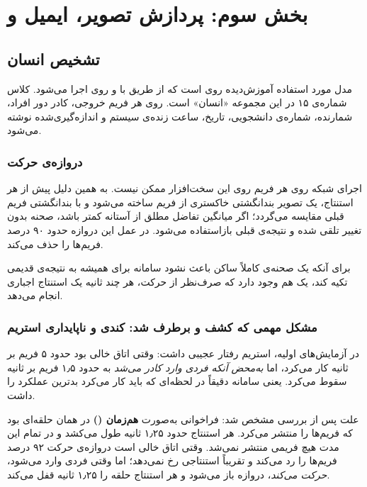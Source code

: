 \section{بخش سوم: پردازش تصویر، ایمیل و }

\subsection{تشخیص انسان}

مدل مورد استفاده  آموزش‌دیده روی  است که از طریق  با  و  روی  اجرا می‌شود. کلاس شماره‌ی ۱۵ در این مجموعه «انسان» است. روی هر فریم خروجی، کادر دور افراد، شمارنده، شماره‌ی دانشجویی، تاریخ، ساعت زنده‌ی سیستم و  اندازه‌گیری‌شده نوشته می‌شود.

\subsubsection*{دروازه‌ی حرکت}

اجرای شبکه روی هر فریم روی این سخت‌افزار ممکن نیست. به همین دلیل پیش از هر استنتاج، یک تصویر بندانگشتی  خاکستری از فریم ساخته می‌شود و با بندانگشتی فریم قبلی مقایسه می‌گردد؛ اگر میانگین تفاضل مطلق از آستانه کمتر باشد، صحنه بدون تغییر تلقی شده و نتیجه‌ی قبلی بازاستفاده می‌شود. در عمل این دروازه حدود ۹۰ درصد فریم‌ها را حذف می‌کند.

برای آنکه یک صحنه‌ی کاملاً ساکن باعث نشود سامانه برای همیشه به نتیجه‌ی قدیمی تکیه کند، یک  هم وجود دارد که صرف‌نظر از حرکت، هر چند ثانیه یک استنتاج اجباری انجام می‌دهد.

\subsubsection*{مشکل مهمی که کشف و برطرف شد: کندی و ناپایداری استریم}

در آزمایش‌های اولیه، استریم رفتار عجیبی داشت: وقتی اتاق خالی بود حدود ۵ فریم بر ثانیه کار می‌کرد، اما \emph{به‌محض آنکه فردی وارد کادر می‌شد} به حدود ۱٫۵ فریم بر ثانیه سقوط می‌کرد. یعنی سامانه دقیقاً در لحظه‌ای که باید کار می‌کرد بدترین عملکرد را داشت.

علت پس از بررسی مشخص شد: فراخوانی  به‌صورت \textbf{هم‌زمان ()} در همان حلقه‌ای بود که فریم‌ها را منتشر می‌کرد. هر استنتاج حدود ۱٫۲۵ ثانیه طول می‌کشد و در تمام این مدت هیچ فریمی منتشر نمی‌شد. وقتی اتاق خالی است دروازه‌ی حرکت ۹۲ درصد فریم‌ها را رد می‌کند و تقریباً استنتاجی رخ نمی‌دهد؛ اما وقتی فردی وارد می‌شود، \emph{حرکت می‌کند}، دروازه باز می‌شود و هر استنتاج حلقه را ۱٫۲۵ ثانیه قفل می‌کند.

